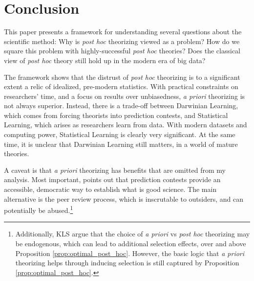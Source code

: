 \documentclass[12pt,english]{article}
\theoremstyle{plain}
\theoremstyle{plain}
\begin{document}
\section{Conclusion}

This paper presents a framework for understanding several questions about the scientific method: Why is \emph{post hoc} theorizing viewed as a problem? How do we square this problem with highly-successful \emph{post hoc} theories? Does the classical view of \emph{post hoc} theory still hold up in the modern era of big data? 

The framework shows that the distrust of \emph{post hoc} theorizing is to a significant extent a relic of  idealized, pre-modern statistics. With practical constraints on researchers' time, and a focus on results over unbiasedness, \emph{a priori} theorizing is not always superior. Instead, there is a trade-off between  Darwinian Learning, which comes from forcing theorists into prediction contests, and Statistical Learning, which arises as researchers learn from data. With  modern datasets and computing power, Statistical Learning is clearly very significant. At the same time, it is unclear that Darwinian Learning still matters, in a world of mature theories.

A caveat is that \emph{a priori} theorizing has benefits that are omitted from my analysis. Most important, \citet{barnes2008paradox} points out that prediction contests provide an accessible, democratic way to establish what is good science. The main alternative is the peer review process, which is inscrutable to outsiders, and can potentially be abused.\footnote{Additionally, KLS argue that the choice of \emph{a priori} vs \emph{post hoc} theorizing may be endogenous, which can lead to additional selection effects, over and above Proposition \ref{prop:optimal_post_hoc}. However, the basic logic that \emph{a priori} theorizing helps through inducing selection is still captured by Proposition \ref{prop:optimal_post_hoc}.}
\end{document}
